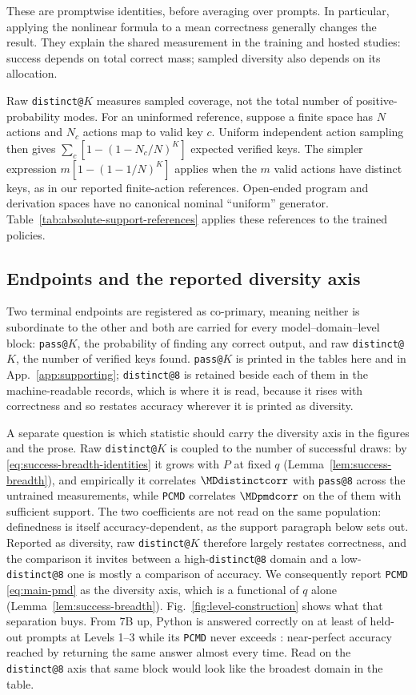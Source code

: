 \documentclass{article}
\makeatletter
\newcommand{\1}{\mathbf 1}
\newcommand{\pmd}{\texttt{PCMD}}
\newcommand{\distk}{\texttt{distinct@8}}
\theoremstyle{remark}
\theoremstyle{definition}
\theoremstyle{plain}
\makeatother
\begin{document}
These are promptwise identities, before averaging over prompts. In particular,
applying the nonlinear formula to a mean correctness generally changes the
result. They explain the shared measurement in the training and hosted
studies: success depends on total correct mass; sampled diversity also depends
on its allocation.

Raw \texttt{distinct@}$K$ measures sampled coverage, not the total number of
positive-probability modes. For an uninformed reference, suppose a finite
space has $N$ actions and $N_c$ actions map to valid key $c$. Uniform
independent action sampling then gives $\sum_c[1-(1-N_c/N)^K]$ expected
verified keys. The simpler expression $m[1-(1-1/N)^K]$ applies when the $m$
valid actions have distinct keys, as in our reported finite-action references.
Open-ended program and derivation spaces have no canonical nominal
``uniform'' generator. Table~\ref{tab:absolute-support-references} applies these
references to the trained policies.

\subsection{Endpoints and the reported diversity axis}
\label{app:registered-endpoints}

Two terminal endpoints are registered as co-primary, meaning neither is
subordinate to the other and both are carried for every
model--domain--level block: \texttt{pass@}$K$, the probability of finding any
correct output, and raw \texttt{distinct@}$K$, the number of verified keys
found. \texttt{pass@}$K$ is printed in the tables here and in
App.~\ref{app:supporting}; \distk{} is retained beside each of them in the
machine-readable records, which is where it is read, because it rises with
correctness and so restates accuracy wherever it is printed as diversity.

A separate question is which statistic should carry the diversity axis in the
figures and the prose. Raw \texttt{distinct@}$K$ is coupled to the number of
successful draws: by \eqref{eq:success-breadth-identities} it grows with $P$
at fixed $q$ (Lemma~\ref{lem:success-breadth}), and empirically it correlates
$\MDdistinctcorr$ with \texttt{pass@8} across the \MDcells{} untrained
measurements, while \pmd{} correlates $\MDpmdcorr$ on the \MDreportable{} of
them with sufficient support. The two coefficients are not read on the same
population: definedness is itself accuracy-dependent, as the support paragraph
below sets out. Reported as diversity, raw \texttt{distinct@}$K$ therefore
largely restates correctness, and the comparison it invites between a
high-\texttt{distinct@8} domain and a
low-\texttt{distinct@8} one is mostly a comparison of accuracy. We
consequently report \pmd{} \eqref{eq:main-pmd} as the diversity axis, which is a
functional of $q$ alone (Lemma~\ref{lem:success-breadth}).
Fig.~\ref{fig:level-construction} shows what that separation buys.
From 7B up, Python is answered correctly on at least \MDpyPasslo{} of held-out
prompts at Levels 1--3 while its \pmd{} never exceeds \MDpyPmdhi{}:
near-perfect accuracy reached by returning the same answer almost every time.
Read on the \texttt{distinct@8} axis that same block would look like the
broadest domain in the table.
\end{document}
